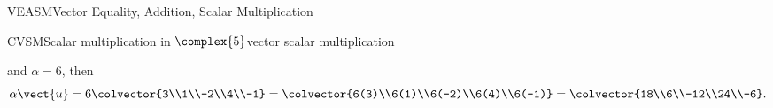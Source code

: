 \begin{subsect}{VEASM}{Vector Equality, Addition, Scalar Multiplication}
\begin{example}{CVSM}{Scalar multiplication in $\complex{5}$}{vector scalar multiplication}
\begin{para}
\begin{equation*}
\end{equation*}
%
and $\alpha=6$, then
%
\begin{equation*}
\alpha\vect{u}=
6\colvector{3\\1\\-2\\4\\-1}=
\colvector{6(3)\\6(1)\\6(-2)\\6(4)\\6(-1)}=
\colvector{18\\6\\-12\\24\\-6}.
\end{equation*}
\end{para}
%
\end{example}
%
%
\end{subsect}
%
